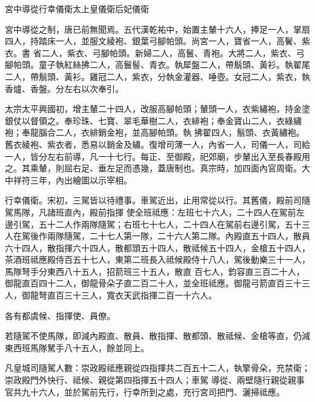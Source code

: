 
\begin{pinyinscope}

 宮中導從行幸儀衛太上皇儀衛后妃儀衛



 宮中導從之制，唐已前無聞焉。五代漢乾祐中，始置主輦十六人，捧足一人，掌扇四人，持踏床一人，並服文綾袍、銀葉弓腳帕頭。尚宮一人，寶省一人，高鬢、紫衣。書
 省二人，紫衣、弓腳帕頭。新婦二人，高鬟、青袍。大將二人，紫衣、弓腳帕頭。童子執紅絲拂二人，高鬟髻、青衣。執犀盤二人，帶鬅頭、黃衫。執翟尾二人，帶鬅頭、黃衫。雞冠二人，紫衣，分執金灌器、唾壺。女冠二人，紫衣，執香爐、香盤。分左右以次奉引。



 太宗太平興國初，增主輦二十四人，改服高腳帕頭；輦頭一人，衣紫繡袍，持金塗銀仗以督領之。奉珍珠、七寶、翠毛華樹二人，衣緋袍；奉金寶山二人，衣綠繡袍；奉龍腦合二人，衣緋銷金袍，並高腳帕頭。執
 拂翟四人，鬅頭、衣黃繡袍。舊衣綾袍、紫衣者，悉易以銷金及繡。復增司薄一人，內省一人，司儀一人，司給一人，皆分左右前導，凡一十七行。每正、至御殿，祀郊廟，步輦出入至長春殿用之。其乘輦，則屈右足、垂左足而憑幾，蓋唐制也。真宗時，加四面內官周衛。大中祥符三年，內出繪圖以示宰相。



 行幸儀衛。宋初，三駕皆以待禮事。車駕近出，止用常從以行。其舊儀，殿前司隨駕馬隊，凡諸班直內，殿前指揮
 使全班祗應：左班七十六人，二十四人在駕前左邊引駕，五十二人作兩隊隨駕；右班七十七人，二十四人在駕前右邊引駕，五十三人在駕後作兩隊隨駕，二十七人第一隊，二十六人第二隊。內殿直五十四人，散員六十四人，散指揮六十四人，散都頭五十四人，散祗候五十四人，金槍五十四人，茶酒班祗應殿侍百五十七人，東第二班長入祗候殿侍十八人，駕後動樂三十一人，馬隊弩手分東西八十五人，招箭班三十五人，散直
 百七人，鈞容直三百二十人，御龍直百四十二人，御龍骨朵子直二百二十人，並全班祗應。御龍弓箭直百三十三人，御龍弩直百三十三人，寬衣天武指揮二百一十六人。



 各有都虞候、指揮使、員僚。



 若隨駕不使馬隊，即減內殿直、散員、散指揮、散都頭、散祗候、金槍等直，仍減東西班馬隊駑手八十五人，餘並同上。



 凡皇城司隨駕人數：崇政殿祗應親從四指揮共二百五十二人，執擎骨朵，充禁衛；崇政殿門外快行、祗候、親從第四指揮五十四人；車駕
 導從、兩壁隨行親從親事官共九十六人，並於駕前先行，行幸所到之處，充行宮司把門、灑掃祗應。




\end{pinyinscope}
